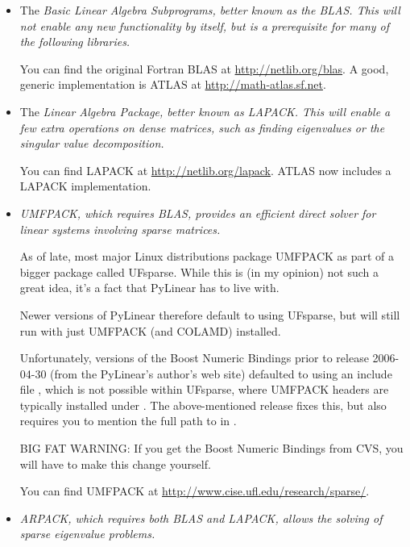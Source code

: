 \begin{itemize}
  \item 
    The \em{Basic Linear Algebra Subprograms}, better known as the BLAS. This will
    not enable any new functionality by itself, but is a prerequisite for many
    of the following libraries.

    You can find the original Fortran BLAS at \url{http://netlib.org/blas}.  A
    good, generic implementation is ATLAS at \url{http://math-atlas.sf.net}.

  \item 
    The \em{Linear Algebra Package}, better known as \em{LAPACK}. This will
    enable a few extra operations on dense matrices, such as finding
    eigenvalues or the singular value decomposition.

    You can find LAPACK at \url{http://netlib.org/lapack}.
    ATLAS now includes a LAPACK implementation.

  \item 
    \em{UMFPACK}, which requires BLAS, provides an efficient direct solver for
    linear systems involving sparse matrices.

    As of late, most major Linux distributions package UMFPACK as part of a
    bigger package called UFsparse. While this is (in my opinion) not such a
    great idea, it's a fact that PyLinear has to live with.

    Newer versions of PyLinear therefore default to using UFsparse,
    but will still run with just UMFPACK (and COLAMD) installed.
    
    Unfortunately, versions of the Boost Numeric Bindings prior to
    release 2006-04-30 (from the PyLinear's author's web site) 
    defaulted to using an include file ,
    which is not possible within UFsparse, where UMFPACK headers
    are typically installed under .
    The above-mentioned release fixes this, but also requires you
    to mention the full path to  in .

    BIG FAT WARNING: If you get the Boost Numeric Bindings from CVS,
    you will have to make this change yourself.

    You can find UMFPACK at \url{http://www.cise.ufl.edu/research/sparse/}.

  \item 
    \em{ARPACK}, which requires both BLAS and LAPACK, allows the solving of
    sparse eigenvalue problems.


\end{itemize}

